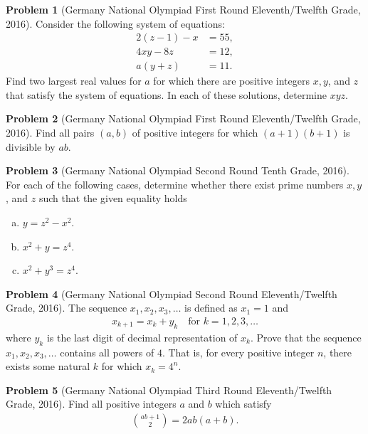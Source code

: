 \documentclass[]{article}
\theoremstyle{definition}
\newtheorem{problem}{Problem}
\begin{document}
\begin{problem}[Germany National Olympiad First Round Eleventh/Twelfth Grade, 2016]
	Consider the following system of equations:
		\begin{align*}
			2(z-1) - x &= 55,\\
			4xy - 8z   &= 12,\\
			a(y+z)     &= 11.
		\end{align*}
	Find two largest real values for $a$ for which there are positive integers $x, y$, and $z$ that satisfy the system of equations. In each of these solutions, determine $xyz$.
\end{problem}



\begin{problem}[Germany National Olympiad First Round Eleventh/Twelfth Grade, 2016]
	Find all pairs $(a, b)$ of positive integers for which $(a + 1) (b + 1)$ is divisible by $ab$.
\end{problem}


\begin{problem}[Germany National Olympiad Second Round Tenth Grade, 2016]
	For each of the following cases, determine whether there exist prime numbers $x,y$, and $z$ such that the given equality holds
		\begin{enumerate}[(a)]
			\item $y=z^2-x^2$.
			\item $x^2+y=z^4$.
			\item $x^2 +y^3 = z^4$.
		\end{enumerate}
\end{problem}



\begin{problem}[Germany National Olympiad Second Round Eleventh/Twelfth Grade, 2016]
	The sequence $x_1, x_2, x_3, \dots$ is defined as $x_1 = 1$ and
		\begin{align*}
			x_{k+1} = x_k + y_k \quad \text{for } k=1, 2, 3, \dots
		\end{align*}
	where $y_k$ is the last digit of decimal representation of $x_k$. Prove that the sequence $x_1, x_2, x_3, \dots$ contains all powers of $4$. That is, for every positive integer $n$, there exists some natural $k$ for which $x_k=4^n$.
\end{problem}


\begin{problem}[Germany National Olympiad Third Round Eleventh/Twelfth Grade, 2016]
	Find all positive integers $a$ and $b$ which satisfy
	\begin{align*}
		\binom{ab+1}{2} = 2ab(a+b).
	\end{align*}
\end{problem}
\end{document}
